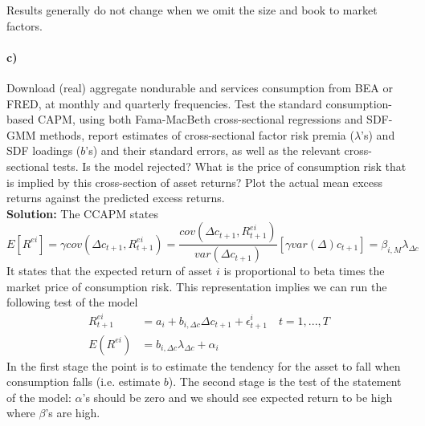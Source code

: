 \documentclass[french, 11pt]{article}
\begin{document}
Results generally do not change when we omit the size and book to market factors. 

\paragraph{c)} Download (real) aggregate nondurable and services consumption from BEA or FRED, at monthly and quarterly frequencies. Test the standard consumption-based CAPM, using both Fama-MacBeth cross-sectional regressions and SDF-GMM methods, report estimates of cross-sectional factor risk premia ($\lambda$'s) and SDF loadings ($b$'s) and their standard errors, as well as the relevant cross-sectional tests. Is the model rejected? What is the price of consumption risk that is implied by this cross-section of asset returns? Plot the actual mean excess returns against the predicted excess returns. \\

\noindent\textbf{Solution:} The CCAPM states
\begin{equation*}
	E\left[R^{ei}\right] = \gamma cov(\Delta c_{t+1}, R^{ei}_{t+1}) = \dfrac{cov(\Delta c_{t+1}, R^{ei}_{t+1})}{var(\Delta c_{t+1})}\left[\gamma var(\Delta)c_{t+1}\right]= \beta_{i, M}\lambda_{\Delta c}
\end{equation*}
It states that the expected return of asset $i$ is proportional to beta times the market price of consumption risk. This representation implies we can run the following test of the model 
\begin{equation*}
	\begin{split}
	R^{ei}_{t+1} &= a_{i} + b_{i, \Delta c}\Delta c_{t+1} + \epsilon^{i}_{t+1} \quad t = 1,..., T\\
	E(R^{ei}) &= b_{i, \Delta c} \lambda_{\Delta c} + \alpha_{i}
	\end{split}
\end{equation*}
In the first stage the point is to estimate the tendency for the asset to fall when consumption falls (i.e. estimate $b$). The second stage is the test of the statement of the model: $\alpha$'s should be zero and we should see expected return to be high where $\beta$'s are high. \\
\end{document}
